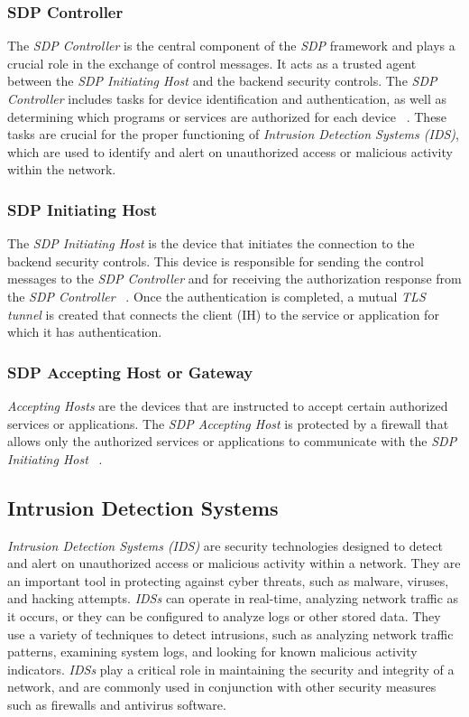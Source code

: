 \subsubsection{SDP Controller}
The \textit{SDP Controller} is the central component of the \textit{SDP} framework and plays a crucial role in the
exchange of control messages.
It acts as a trusted agent between the \textit{SDP Initiating Host} and the backend security controls.
The \textit{SDP Controller} includes tasks for device identification and authentication, as well as determining which
programs or services are authorized for each device ~\cite{Koilpillai2020, Kumar2019}.
These tasks are crucial for the proper functioning of \textit{Intrusion Detection Systems (IDS)}, which are used to
identify and alert on unauthorized access or malicious activity within the network.

\subsubsection{SDP Initiating Host}
The \textit{SDP Initiating Host} is the device that initiates the connection to the backend security controls.
This device is responsible for sending the control messages to the \textit{SDP Controller} and for receiving the
authorization response from the \textit{SDP Controller} ~\cite{Koilpillai2020, Kumar2019}.
Once the authentication is completed, a mutual \textit{TLS tunnel} is created that connects the client (IH) to the
service or application for which it has authentication.

\subsubsection{SDP Accepting Host or Gateway}
\textit{Accepting Hosts} are the devices that are instructed to accept certain authorized services or applications.
The \textit{SDP Accepting Host} is protected by a firewall that allows only the authorized services or applications to
communicate with the \textit{SDP Initiating Host} ~\cite{Koilpillai2020, Kumar2019}.


\subsection{Intrusion Detection Systems}\label{subsec:intrusion-detection-systems}
\textit{Intrusion Detection Systems (IDS)} are security technologies designed to detect and alert on unauthorized
access or malicious activity within a network.
They are an important tool in protecting against cyber threats, such as malware, viruses, and hacking attempts.
\textit{IDSs} can operate in real-time, analyzing network traffic as it occurs, or they can be configured to analyze
logs or other stored data.
They use a variety of techniques to detect intrusions, such as analyzing network traffic patterns, examining system
logs, and looking for known malicious activity indicators.
\textit{IDSs} play a critical role in maintaining the security and integrity of a network, and are commonly used in
conjunction with other security measures such as firewalls and antivirus software.

